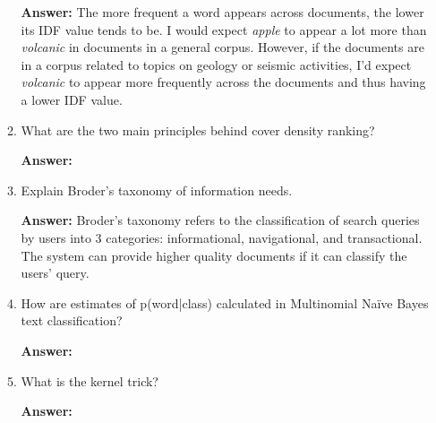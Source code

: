 \documentclass[11pt]{article}
\begin{document}
\begin{enumerate}
\begin{enumerate}
                \textbf{Answer:} The more frequent a word appears across documents, the lower its IDF value tends to be. I would expect \textit{apple} to appear a lot more than \textit{volcanic} in documents in a general corpus. However, if the documents are in a corpus related to topics on geology or seismic activities, I'd expect \textit{volcanic} to appear more frequently across the documents and thus having a lower IDF value.

          \item What are the two main principles behind cover density ranking?

                \textbf{Answer:}

          \item Explain Broder's taxonomy of information needs.

                \textbf{Answer:} Broder's taxonomy refers to the classification of search queries by users into 3 categories: informational, navigational, and transactional. The system can provide higher quality documents if it can classify the users' query.

          \item How are estimates of p(word|class) calculated in Multinomial Naïve Bayes text classification?

                \textbf{Answer:}

          \item What is the kernel trick?

                \textbf{Answer:}

        \end{enumerate}

\end{enumerate}
\end{document}
